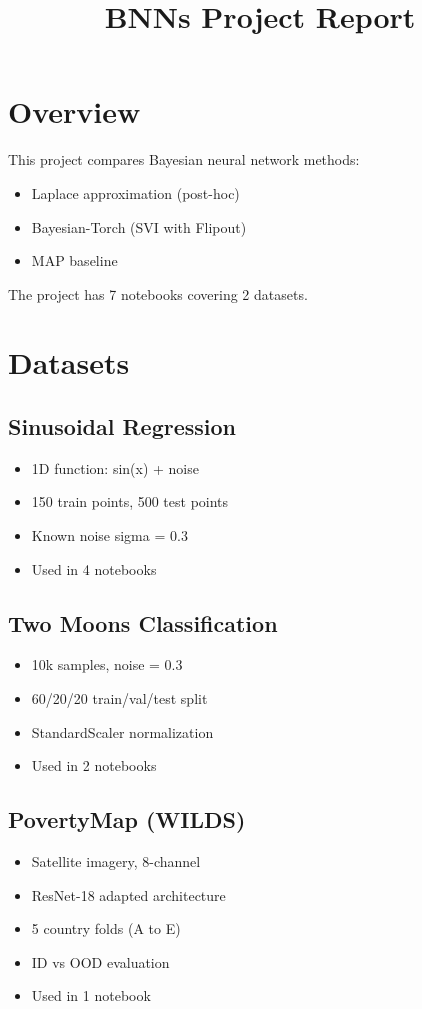 \documentclass[11pt]{article}
\title{BNNs Project Report}
\date{}
\begin{document}
\maketitle

\section{Overview}
This project compares Bayesian neural network methods:
\begin{itemize}
\item Laplace approximation (post-hoc)
\item Bayesian-Torch (SVI with Flipout)
\item MAP baseline
\end{itemize}

The project has 7 notebooks covering 2 datasets.

\section{Datasets}

\subsection{Sinusoidal Regression}
\begin{itemize}
\item 1D function: sin(x) + noise
\item 150 train points, 500 test points
\item Known noise sigma = 0.3
\item Used in 4 notebooks
\end{itemize}

\subsection{Two Moons Classification}
\begin{itemize}
\item 10k samples, noise = 0.3
\item 60/20/20 train/val/test split
\item StandardScaler normalization
\item Used in 2 notebooks
\end{itemize}

\subsection{PovertyMap (WILDS)}
\begin{itemize}
\item Satellite imagery, 8-channel
\item ResNet-18 adapted architecture
\item 5 country folds (A to E)
\item ID vs OOD evaluation
\item Used in 1 notebook
\end{itemize}
\end{document}
